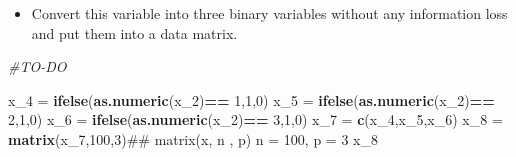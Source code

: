 \documentclass[]{article}
\newenvironment{Shaded}{\begin{snugshade}}{\end{snugshade}}
\newcommand{\KeywordTok}[1]{\textcolor[rgb]{0.13,0.29,0.53}{\textbf{#1}}}
\newcommand{\DecValTok}[1]{\textcolor[rgb]{0.00,0.00,0.81}{#1}}
\newcommand{\StringTok}[1]{\textcolor[rgb]{0.31,0.60,0.02}{#1}}
\newcommand{\CommentTok}[1]{\textcolor[rgb]{0.56,0.35,0.01}{\textit{#1}}}
\newcommand{\OperatorTok}[1]{\textcolor[rgb]{0.81,0.36,0.00}{\textbf{#1}}}
\newcommand{\NormalTok}[1]{#1}
\providecommand{\tightlist}{%
  \setlength{\itemsep}{0pt}\setlength{\parskip}{0pt}}
\begin{document}
\begin{itemize}
\tightlist
\item
  Convert this variable into three binary variables without any
  information loss and put them into a data matrix.
\end{itemize}

\begin{Shaded}
\begin{Highlighting}[]
\CommentTok{#TO-DO}

\NormalTok{x_}\DecValTok{4}\NormalTok{ =}\StringTok{ }\KeywordTok{ifelse}\NormalTok{(}\KeywordTok{as.numeric}\NormalTok{(x_}\DecValTok{2}\NormalTok{)}\OperatorTok{==}\StringTok{ }\DecValTok{1}\NormalTok{,}\DecValTok{1}\NormalTok{,}\DecValTok{0}\NormalTok{)}
\NormalTok{x_}\DecValTok{5}\NormalTok{ =}\StringTok{ }\KeywordTok{ifelse}\NormalTok{(}\KeywordTok{as.numeric}\NormalTok{(x_}\DecValTok{2}\NormalTok{)}\OperatorTok{==}\StringTok{ }\DecValTok{2}\NormalTok{,}\DecValTok{1}\NormalTok{,}\DecValTok{0}\NormalTok{)}
\NormalTok{x_}\DecValTok{6}\NormalTok{ =}\StringTok{ }\KeywordTok{ifelse}\NormalTok{(}\KeywordTok{as.numeric}\NormalTok{(x_}\DecValTok{2}\NormalTok{)}\OperatorTok{==}\StringTok{ }\DecValTok{3}\NormalTok{,}\DecValTok{1}\NormalTok{,}\DecValTok{0}\NormalTok{)}
\NormalTok{x_}\DecValTok{7}\NormalTok{ =}\StringTok{ }\KeywordTok{c}\NormalTok{(x_}\DecValTok{4}\NormalTok{,x_}\DecValTok{5}\NormalTok{,x_}\DecValTok{6}\NormalTok{)}
\NormalTok{x_}\DecValTok{8}\NormalTok{ =}\StringTok{ }\KeywordTok{matrix}\NormalTok{(x_}\DecValTok{7}\NormalTok{,}\DecValTok{100}\NormalTok{,}\DecValTok{3}\NormalTok{)## matrix(x, n , p) n = 100, p = 3}
\NormalTok{x_}\DecValTok{8}
\end{Highlighting}
\end{Shaded}
\end{document}
